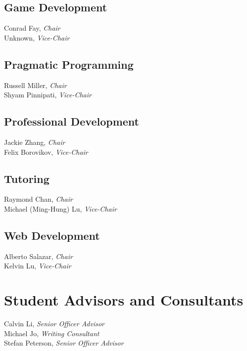 \documentclass[10pt]{article}
\newcommand{\chair}[1]{#1, \textit{Chair}}
\newcommand{\vicechair}[1]{#1, \textit{Vice-Chair}}
\begin{document}
\subsection{Game Development}

\chair{Conrad Fay}\\
\vicechair{Unknown}

\subsection{Pragmatic Programming}

\chair{Russell Miller}\\
\vicechair{Shyam Pinnipati}

\subsection{Professional Development}

\chair{Jackie Zhang}\\
\vicechair{Felix Borovikov}

\subsection{Tutoring}

\chair{Raymond Chan}\\
\vicechair{Michael (Ming-Hung) Lu}


\subsection{Web Development}

\chair{Alberto Salazar}\\
\vicechair{Kelvin Lu}

\section{Student Advisors and Consultants}

Calvin Li, \textit{Senior Officer Advisor}\\
Michael Jo, \textit{Writing Consultant}\\
Stefan Peterson, \textit{Senior Officer Advisor}
\end{document}
